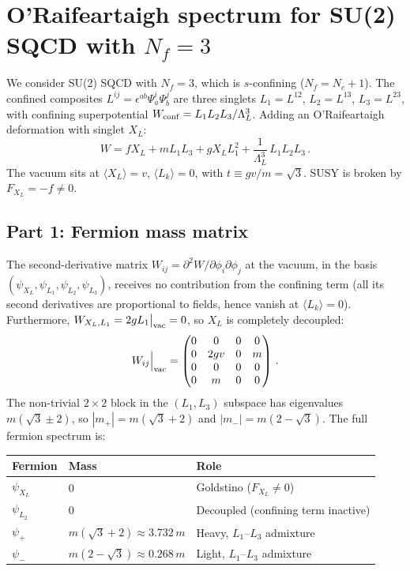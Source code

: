 \documentclass[12pt]{article}
\begin{document}
\section*{O'Raifeartaigh spectrum for SU(2) SQCD with $N_f=3$}

We consider SU(2) SQCD with $N_f=3$, which is $s$-confining ($N_f = N_c+1$). The confined composites $L^{ij} = \epsilon^{ab}\Psi^i_a\Psi^j_b$ are three singlets $L_1=L^{12}$, $L_2=L^{13}$, $L_3=L^{23}$, with confining superpotential $W_{\rm conf} = L_1 L_2 L_3/\Lambda_L^3$. Adding an O'Raifeartaigh deformation with singlet $X_L$:
$$
W = f X_L + m L_1 L_3 + g X_L L_1^2 + \frac{1}{\Lambda_L^3}\,L_1 L_2 L_3\,.
$$
The vacuum sits at $\langle X_L\rangle = v$, $\langle L_k\rangle = 0$, with $t \equiv gv/m = \sqrt{3}$. SUSY is broken by $F_{X_L} = -f \neq 0$.

\subsection*{Part 1: Fermion mass matrix}

The second-derivative matrix $W_{ij} = \partial^2 W/\partial\phi_i\partial\phi_j$ at the vacuum, in the basis $(\psi_{X_L},\psi_{L_1},\psi_{L_2},\psi_{L_3})$, receives no contribution from the confining term (all its second derivatives are proportional to fields, hence vanish at $\langle L_k\rangle=0$). Furthermore, $W_{X_L,L_1} = 2gL_1\big|_{\rm vac} = 0$, so $X_L$ is completely decoupled:
$$
W_{ij}\Big|_{\rm vac} = 
\begin{pmatrix} 0 & 0 & 0 & 0 \\ 0 & 2gv & 0 & m \\ 0 & 0 & 0 & 0 \\ 0 & m & 0 & 0 \end{pmatrix}\,.
$$
The non-trivial $2\times 2$ block in the $(L_1,L_3)$ subspace has eigenvalues $m(\sqrt{3}\pm 2)$, so $|m_+| = m(\sqrt{3}+2)$ and $|m_-| = m(2-\sqrt{3})$. The full fermion spectrum is:

\medskip\noindent
\begin{tabular}{lll}
\toprule
Fermion & Mass & Role \\
\midrule
$\psi_{X_L}$ & $0$ & Goldstino ($F_{X_L}\neq 0$) \\
$\psi_{L_2}$ & $0$ & Decoupled (confining term inactive) \\
$\psi_+$ & $m(\sqrt{3}+2) \approx 3.732\,m$ & Heavy, $L_1$--$L_3$ admixture \\
$\psi_-$ & $m(2-\sqrt{3}) \approx 0.268\,m$ & Light, $L_1$--$L_3$ admixture \\
\bottomrule
\end{tabular}
\end{document}
